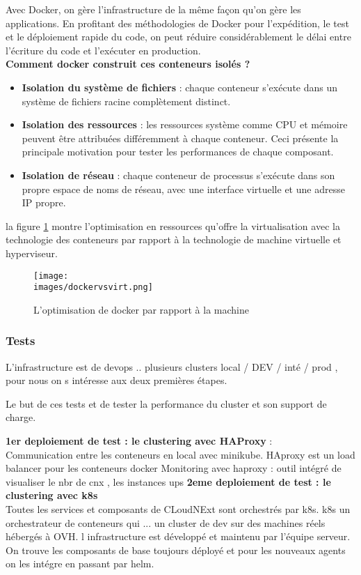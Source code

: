     Avec Docker, on gère l’infrastructure de la même façon qu’on gère les applications.
    En profitant des méthodologies de Docker pour l’expédition, le test et le déploiement rapide
    du code, on peut réduire considérablement le délai entre l’écriture du code et l’exécuter en
    production.\\
    \textbf{Comment docker construit ces conteneurs isolés ?} \\
    \begin{itemize}
        \item \textbf{Isolation du système de fichiers} : chaque conteneur s’exécute dans un système de fichiers
        racine complètement distinct.
        \item \textbf{Isolation des ressources} : les ressources système comme CPU et mémoire peuvent être
        attribuées différemment à chaque conteneur.  Ceci présente la principale motivation pour tester les performances de chaque composant.
        \item \textbf{Isolation de réseau}  : chaque conteneur de processus s’exécute dans son propre espace de
        noms de réseau, avec une interface virtuelle et une adresse IP propre.
    \end{itemize}

    la figure \ref{fig:docker} montre l’optimisation en ressources qu’offre la virtualisation avec la technologie
    des conteneurs par rapport à la technologie de machine virtuelle et hyperviseur.

    \begin{figure}[ht]
        \centering
        \texttt{[image: \\images/dockervsvirt.png]}
        \caption{L'optimisation de docker par rapport à la machine }
        \label{fig:docker}
    \end{figure}
    \break

    \subsubsection{Tests}
    L'infrastructure est de devops .. plusieurs clusters 
    local / DEV / inté / prod , pour nous on s intéresse aux deux premières étapes. 

    Le but de ces tests et de tester la performance du cluster et son support de charge.

    \textbf{1er deploiement de test : le clustering avec HAProxy } :\\
    Communication entre les conteneurs en local avec minikube. 
    HAproxy est un load balancer pour les conteneurs docker
    Monitoring avec haproxy : outil intégré de visualiser le nbr de cnx , les instances ups
    \textbf{2eme deploiement de test : le clustering avec \gls{k8s} }\\
    Toutes les services et composants de CLoudNExt sont orchestrés par k8s.
    \gls{k8s} un  orchestrateur de conteneurs qui ... 
    un cluster de dev sur des machines réels hébergés à OVH. 
    l infrastructure est développé et maintenu par l'équipe serveur. 
    On trouve les composants de base toujours déployé et pour les nouveaux agents on les intégre en passant par helm.  


